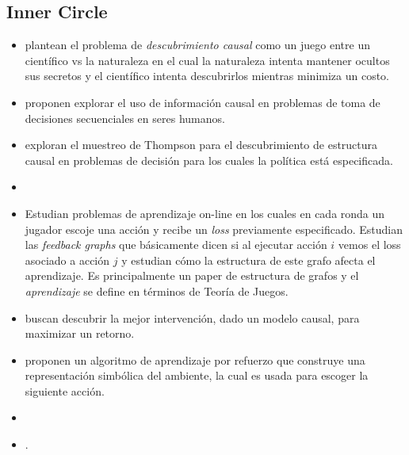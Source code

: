 \documentclass[11pt]{article}
\theoremstyle{plain}
\begin{document}
\subsection{Inner Circle}
\begin{itemize}
\item \cite{eberhardt2008causal} plantean el problema de \textit{descubrimiento causal} como un juego entre un científico vs la naturaleza en el cual la naturaleza intenta mantener ocultos sus secretos y el científico intenta descubrirlos mientras minimiza un costo. 
\item \cite{hagmayer2013repeated} proponen explorar el uso de información causal en problemas de toma de decisiones secuenciales en seres humanos.
\item \cite{ortega2014generalized} exploran el muestreo de Thompson para el descubrimiento de estructura causal en problemas de decisión para los cuales la política está especificada.
\item \cite{bramley2015staying}
\item \cite{alon2015online} Estudian problemas de aprendizaje on-line en los cuales en cada ronda un jugador escoje una acción y recibe un \textit{loss} previamente especificado. Estudian las \textit{feedback graphs} que básicamente dicen si al ejecutar acción $i$ vemos el loss asociado a acción $j$ y estudian cómo la estructura de este grafo afecta el aprendizaje. Es principalmente un paper de estructura de grafos y el \textit{aprendizaje} se define en términos de Teoría de Juegos.
\item \cite{lattimoreNIPS2016} buscan descubrir la mejor intervención, dado un modelo causal, para maximizar un retorno.
\item \cite{garnelo2016towards} proponen un algoritmo de aprendizaje por refuerzo que construye una representación simbólica del ambiente, la cual es usada para escoger la siguiente acción.
\item \cite{pearl2018theoretical}
\item \cite{innes2018reasoning}. 
\end{itemize}
\end{document}
